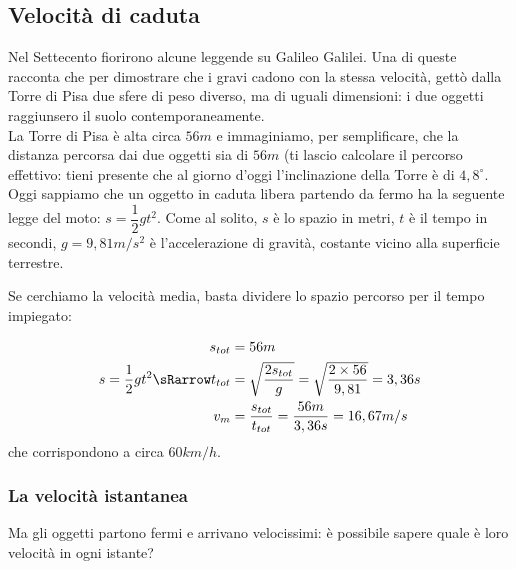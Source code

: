 \subsection{Velocità di caduta}
\label{subsec:differenziazione_velcaduta}
Nel Settecento fiorirono alcune leggende su Galileo Galilei. Una di queste 
racconta che per dimostrare che i gravi cadono con la stessa velocità, 
gettò dalla Torre di Pisa due sfere di peso diverso, ma di uguali 
dimensioni: i due oggetti raggiunsero il suolo 
contemporaneamente.\\
La Torre di Pisa è alta circa \(56m\) e immaginiamo, per semplificare, 
che la distanza percorsa dai due oggetti sia di \(56m\) (ti lascio 
calcolare il percorso effettivo: tieni presente che al giorno d'oggi 
l'inclinazione della Torre è di \(4,8^\circ\).\\
Oggi sappiamo che un oggetto in caduta libera partendo da fermo ha la 
seguente legge del moto:
\(s=\dfrac{1}{2}gt^2\). Come al solito, \(s\) è lo spazio in metri, 
\(t\) è il tempo in secondi, \(g=9,81 m/s^2\) è l'accelerazione di 
gravità, costante vicino alla superficie terrestre.

\newpage %

Se cerchiamo la velocità media, basta dividere lo spazio percorso per il 
tempo impiegato:

\begin{align*}
 s_{tot} &= 56m\\
 s=\frac{1}{2}gt^2 \sRarrow t_{tot} &= \sqrt{\frac{2s_{tot}}{g}}=
 \sqrt{\frac{2\times 56}{9,81}}=3,36 s\\
 v_m &= \frac{s_{tot}}{t_{tot}}=\frac{56 m}{3,36 s}=16,67 m/s
\end{align*}
che corrispondono a circa \(60 km/h\).

\subsubsection{La velocità istantanea}

Ma gli oggetti partono fermi e arrivano velocissimi: 
è possibile sapere quale è loro velocità in ogni istante?


